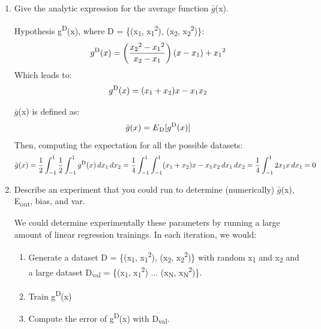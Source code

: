 \documentclass{article}
\begin{document}
\begin{enumerate}[label=(\alph*)]
\item Give the analytic expression for the average function $\bar{g}$(x).

Hypothesis g\textsuperscript{D}(x), where D = \{(x\textsubscript{1}, x\textsubscript{1}\textsuperscript{2}), (x\textsubscript{2}, x\textsubscript{2}\textsuperscript{2})\}:
\begin{equation} 
g\textsuperscript{D}(x) = \left(\frac{x\textsubscript{2}\textsuperscript{2} - x\textsubscript{1}\textsuperscript{2}}{x\textsubscript{2} - x\textsubscript{1}}\right)(x - x\textsubscript{1}) + x\textsubscript{1}\textsuperscript{2}
\end{equation}
Which leads to:
\begin{equation} 
g\textsuperscript{D}(x) = (x\textsubscript{1} + x\textsubscript{2})x - x\textsubscript{1}x\textsubscript{2}
\end{equation}

$\bar{g}$(x) is defined as:
\begin{equation} 
\bar{g}(x) = E\textsubscript{D}[g\textsuperscript{D}(x)]
\end{equation}
Then, computing the expectation for all the possible datasets:
\begin{equation} 
\bar{g}(x) = \frac{1}{2} \int_{-1}^{1} \frac{1}{2} \int_{-1}^{1} g\textsuperscript{D}(x) \,dx\textsubscript{1}\,dx\textsubscript{2} = \frac{1}{4} \int_{-1}^{1} \int_{-1}^{1} (x\textsubscript{1} + x\textsubscript{2})x - x\textsubscript{1}x\textsubscript{2} \,dx\textsubscript{1}\,dx\textsubscript{2} = 
\frac{1}{4} \int_{-1}^{1} 2x\textsubscript{1}x \,dx\textsubscript{1} = 0
\end{equation} 

\item Describe an experiment that you could run to determine (numerically)
$\bar{g}$(x), E\textsubscript{out}, bias, and var.

We could determine experimentally these parameters by running a large amount of linear regression trainings. In each iteration, we would:
\begin{enumerate}
\item Generate a dataset D = \{(x\textsubscript{1}, x\textsubscript{1}\textsuperscript{2}), (x\textsubscript{2}, x\textsubscript{2}\textsuperscript{2})\} with random x\textsubscript{1} and x\textsubscript{2} and a large dataset D\textsubscript{val} = \{(x\textsubscript{1}, x\textsubscript{1}\textsuperscript{2}) ... (x\textsubscript{N}, x\textsubscript{N}\textsuperscript{2})\}.
\item Train g\textsuperscript{D}(x)
\item Compute the error of g\textsuperscript{D}(x) with D\textsubscript{val}.
\end{enumerate}


\end{enumerate}
\end{document}

